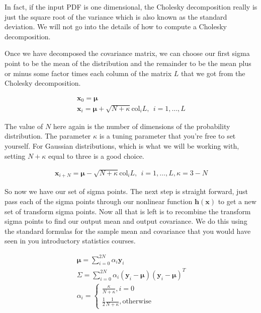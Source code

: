 In fact, if the input PDF is one dimensional, the Cholesky decomposition really is
just the square root of the variance which is also known as
the standard deviation. We will not go into the details of how
to compute a Cholesky decomposition. 

Once we have decomposed the covariance matrix, we can choose our first sigma point to
be the mean of the distribution and the remainder to be the mean plus or
minus some factor times each column of the matrix $L$ that
we got from the Cholesky decomposition. 

\begin{eqnarray}
\mathbf{x}_0 = \boldsymbol{\mu} \\
\mathbf{x}_i = \boldsymbol{\mu} + \sqrt{N + \kappa} \text{col}_i L, ~~ i = 1, \ldots, L
\end{eqnarray}

The value of $N$ here again is the number of dimensions of the probability distribution. The parameter $\kappa$ is a tuning parameter
that you're free to set yourself. For Gaussian distributions, which is what we will be working with, setting $N + \kappa$ equal
to three is a good choice. 

\begin{eqnarray}
\mathbf{x}_{i + N} = \boldsymbol{\mu} - \sqrt{N + \kappa} \text{col}_i L, ~~ i = 1, \ldots, L, \kappa = 3 - N
\end{eqnarray}

So now we have our set of sigma points. The next step is straight forward, just
pass each of the sigma points through our nonlinear function $\mathbf{h}(\mathbf{x})$ to get a new
set of transform sigma points. Now all that is left is to recombine the transform sigma points to find our output mean and
output covariance. We do this using the standard formulas for the sample mean and covariance that you would have seen in you introductory statistics courses. 


\begin{eqnarray}
\boldsymbol{\mu} = \sum_{i=0}^{2N} \alpha_i \mathbf{y}_i \\
\Sigma = \sum_{i=0}^{2N} \alpha_i (\mathbf{y}_i - \boldsymbol{\mu})(\mathbf{y}_i - \boldsymbol{\mu})^T \\
\alpha_i = 
\begin{cases}
\frac{\kappa}{N + \kappa}, i =0 \\
\frac{1}{2}\frac{1}{N + \kappa}, \text{otherwise}
\end{cases}
\end{eqnarray}


